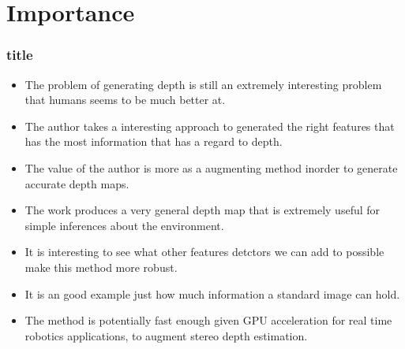 \documentclass[handout]{beamer}
\newcommand{\vitem}{\vfill\item}
\begin{document}
\section{Importance}
\begin{frame}[t]\frametitle{title}
    \begin{itemize}
        \item The problem of generating depth is still an extremely interesting problem that humans seems to be much better at.
        \vitem The author takes a interesting approach to generated the right features that has the most information that has a regard to depth. 
        \vitem The value of the author is more as a augmenting method inorder to generate accurate depth maps.
        \vitem The work produces a very general depth map that is extremely useful for simple inferences about the environment.
        \vitem It is interesting to see what other features detctors we can add to possible make this method more robust.
        \vitem It is an good example just how much information a standard image can hold.
        \vitem The method is potentially fast enough given GPU acceleration for real time robotics applications, to augment stereo depth estimation.
    \end{itemize}
\end{frame}
\end{document}
